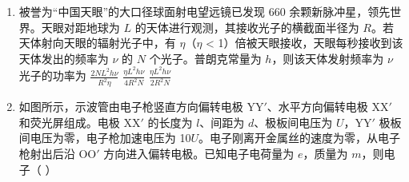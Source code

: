 \documentclass[\gkver]{gaokaozhenti}
\begin{document}
\begin{enumerate}
则相邻两次“冲日”时间间隔约为
{火星 800 天}
{天王星 365 天}
{天王星 800 天}

\item
被誉为“中国天眼”的大口径球面射电望远镜已发现 660 余颗新脉冲星，领先世界。天眼对距地球为 $L$ 的天体进行观测，其接收光子的横截面半径为 $R$。若天体射向天眼的辐射光子中，有 $\eta$（$\eta$ < 1）倍被天眼接收，天眼每秒接收到该天体发出的频率为 $\nu$ 的 $N$ 个光子。普朗克常量为 $h$，则该天体发射频率为 $\nu$ 光子的功率为
{$\frac{{2N{L^2}h\nu }}{{{R^2}\eta }}$}
{$\frac{{\eta {L^2}h\nu }}{{4{R^2}N}}$}
{$\frac{{\eta {L^2}h\nu }}{{2{R^2}N}}$}

\item
如图所示，示波管由电子枪竖直方向偏转电极 YY$'$、水平方向偏转电极 XX$'$ 和荧光屏组成。电极 XX$'$ 的长度为 $l$、间距为 $d$、极板间电压为 $U$，YY$'$ 极板间电压为零，电子枪加速电压为 10$U$。电子刚离开金属丝的速度为零，从电子枪射出后沿 OO$'$ 方向进入偏转电极。已知电子电荷量为 $e$，质量为 $m$，则电子（    ）
\end{enumerate}
\end{document}
